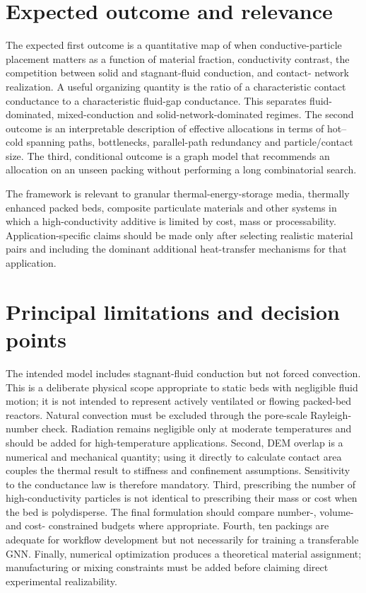 \documentclass[12pt,a4paper]{article}
\begin{document}
\section{Expected outcome and relevance}

The expected first outcome is a quantitative map of when conductive-particle
placement matters as a function of material fraction, conductivity contrast,
the competition between solid and stagnant-fluid conduction, and contact-
network realization. A useful organizing quantity is the ratio of a
characteristic contact conductance to a characteristic fluid-gap conductance.
This separates fluid-dominated, mixed-conduction and solid-network-dominated
regimes. The second outcome is an interpretable description of
effective allocations in terms of hot--cold spanning paths, bottlenecks,
parallel-path redundancy and particle/contact size. The third, conditional
outcome is a graph model that recommends an allocation on an unseen packing
without performing a long combinatorial search.

The framework is relevant to granular thermal-energy-storage media, thermally
enhanced packed beds, composite particulate materials and other systems in
which a high-conductivity additive is limited by cost, mass or processability.
Application-specific claims should be made only after selecting realistic
material pairs and including the dominant additional heat-transfer mechanisms
for that application.

\section{Principal limitations and decision points}

The intended model includes stagnant-fluid conduction but not forced convection.
This is a deliberate physical scope appropriate to static beds with negligible
fluid motion; it is not intended to represent actively ventilated or flowing
packed-bed reactors. Natural convection must be excluded through the pore-scale
Rayleigh-number check. Radiation remains negligible only at moderate
temperatures and should be added for high-temperature applications. Second, DEM
overlap is a numerical and mechanical
quantity; using it directly to calculate contact area couples the thermal result
to stiffness and confinement assumptions. Sensitivity to the conductance law is
therefore mandatory. Third, prescribing the number of high-conductivity
particles is not identical to prescribing their mass or cost when the bed is
polydisperse. The final formulation should compare number-, volume- and cost-
constrained budgets where appropriate. Fourth, ten packings are adequate for
workflow development but not necessarily for training a transferable GNN.
Finally, numerical optimization produces a theoretical material assignment;
manufacturing or mixing constraints must be added before claiming direct
experimental realizability.
\end{document}
